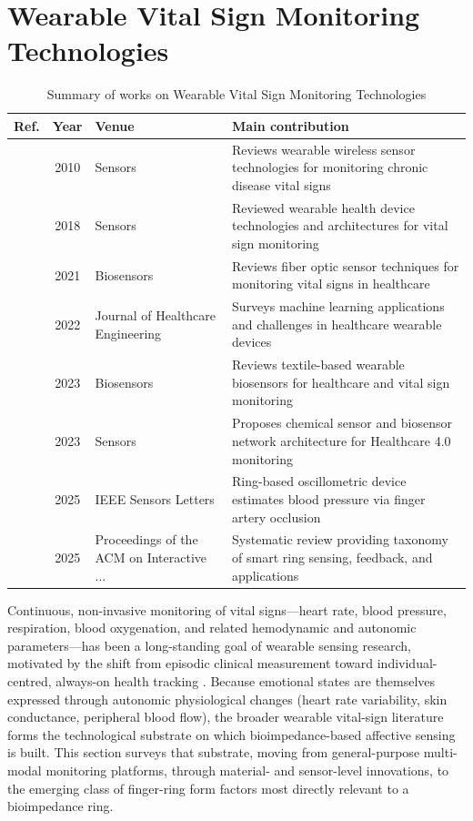 \section{Wearable Vital Sign Monitoring Technologies}\label{sec:theme4}
\begin{table}[!t]
\centering
\renewcommand{\arraystretch}{1.2}
\caption{Summary of works on Wearable Vital Sign Monitoring Technologies}\label{tab:theme4}
\begin{tabularx}{\textwidth}{@{}l c p{3.6cm} X@{}}
\toprule
\textbf{Ref.} & \textbf{Year} & \textbf{Venue} & \textbf{Main contribution} \\
\midrule
\cite{yilmaz2010detecting} & 2010 & Sensors & Reviews wearable wireless sensor technologies for monitoring chronic disease vital signs \\
\cite{dias2018wearable} & 2018 & Sensors & Reviewed wearable health device technologies and architectures for vital sign monitoring \\
\cite{mayoral2021fiber} & 2021 & Biosensors & Reviews fiber optic sensor techniques for monitoring vital signs in healthcare \\
\cite{sabry2022machine} & 2022 & Journal of Healthcare Engineering & Surveys machine learning applications and challenges in healthcare wearable devices \\
\cite{li2023advanced} & 2023 & Biosensors & Reviews textile-based wearable biosensors for healthcare and vital sign monitoring \\
\cite{he2023smart} & 2023 & Sensors & Proposes chemical sensor and biosensor network architecture for Healthcare 4.0 monitoring \\
\cite{lindstrom2025wearable} & 2025 & IEEE Sensors Letters & Ring-based oscillometric device estimates blood pressure via finger artery occlusion \\
\cite{wang2025computing} & 2025 & Proceedings of the ACM on Interactive ... & Systematic review providing taxonomy of smart ring sensing, feedback, and applications \\
\bottomrule
\end{tabularx}
\end{table}

Continuous, non-invasive monitoring of vital signs---heart rate, blood pressure, respiration, blood oxygenation, and related hemodynamic and autonomic parameters---has been a long-standing goal of wearable sensing research, motivated by the shift from episodic clinical measurement toward individual-centred, always-on health tracking \cite{yilmaz2010detecting}. Because emotional states are themselves expressed through autonomic physiological changes (heart rate variability, skin conductance, peripheral blood flow), the broader wearable vital-sign literature forms the technological substrate on which bioimpedance-based affective sensing is built. This section surveys that substrate, moving from general-purpose multi-modal monitoring platforms, through material- and sensor-level innovations, to the emerging class of finger-ring form factors most directly relevant to a bioimpedance ring.

